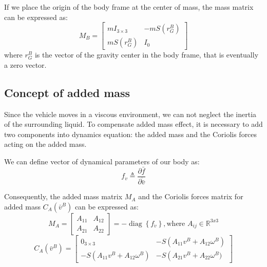     If we place the origin of the body frame at the center of mass, the mass matrix can be expressed as:
    \begin{equation}
        M_B=\left[\begin{array}{cc}
            m I_{3 \times 3} & -m S\left(r_G^B\right) \\
            m S\left(r_G^B\right) & I_0
        \end{array}\right]
    \end{equation}
    where $r_G^B$ is the vector of the gravity center in the body frame, that is eventually a zero vector.

\subsection{Concept of added mass}

    Since the vehicle moves in a viscous environment, we can not neglect the inertia of the surrounding liquid.
    To compensate added mass effect, it is necessary to add two components into dynamics equation: 
    the added mass and the Coriolis forces acting on the added mass.

    We can define vector of dynamical parameters of our body as:
    \begin{equation}
        f_{\dot{v}} \triangleq \frac{\partial \bar{f}}{\partial \dot{\bar{v}}}
    \end{equation}

    Consequently, the added mass matrix $M_A$ and 
    the Coriolis forces matrix for added mass $C_A(\bar v^B)$
    can be expressed as: 
    \begin{equation}
        M_A=\left[\begin{array}{cc}
            A_{11} & A_{12} \\
            A_{21} & A_{22}
            \end{array}\right]=-\operatorname{diag}\left\{f_{\dot{v}}\right\}, \textrm{where } A_{ij} \in \mathbb{R}^{3 x 3}
    \end{equation}
    \begin{equation}
        C_A(\bar{v}^B)=\left[\begin{array}{cc}
            0_{3 \times 3} & -S\left(A_{11} v^B+A_{12} \omega^B\right) \\
            -S\left(A_{11} v^B+A_{12} \omega^B\right) & -S\left(A_{21} v^B+A_{22} \omega^B)\right.
            \end{array}\right]
    \end{equation}

